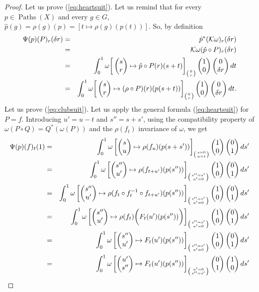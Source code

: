 \documentclass[10pt,reqno,twoside]{amsart}
\newcommand{\mymatrix}[1]{\begin{pmatrix} #1 \end{pmatrix}}
\newcommand{\cK}{\mathcal{K}}
\DeclareMathOperator{\Paths}{Paths}
\theoremstyle{plain}
\theoremstyle{definition}
\begin{document}
  \begin{proof}
    Let us prove (\ref{eq:heartsuit}).
    Let us remind that for every $p \in \Paths(X)$ and every $g \in G$,
    $\hat p (g) = \rho(g)(p) = [t \mapsto \rho(g)(p(t))]$.
    So,
    by definition
    \begin{eqnarray*}
      \Psi(p)(P)_r(\delta r) &=& \hat p^*(\cK\omega)_r(\delta r) \\
      &=& \cK\omega(\hat p \circ P)_r(\delta r) \\
      &=& \int_0^1 \omega \bigg[\mymatrix{s \cr r} \mapsto \hat p \circ P (r)(s+t) \bigg]_{\left({0 \atop r}\right)} \mymatrix{1 \cr 0} \mymatrix{0 \cr \delta r} dt \\
      &=& \int_0^1 \omega \bigg[\mymatrix{s \cr r} \mapsto (\rho \circ P)(r)(p(s+t)) \bigg]_{\left({0 \atop r}\right)} \mymatrix{1 \cr 0} \mymatrix{0 \cr \delta r} dt.
    \end{eqnarray*}
    Let us prove (\ref{eq:clubsuit}).
    Let us apply the general formula (\ref{eq:heartsuit}) for $P = f$.
    Introducing $u' = u-t$ and $s'' = s+s'$,
    using the compatibility property of $\omega(P \circ Q) = Q^*(\omega(P))$ and the $\rho(f_t)$ invariance of $\omega$,
    we get
    \begin{eqnarray*}
      \Psi(p)(f)_t(1) &=& \int_0^1 \omega \left[ \mymatrix{s \cr u} \mapsto \rho(f_u)(p(s + s')) \right]_{\left({s=0 \atop u=t}\right)}\mymatrix{1 \cr 0} \mymatrix{0 \cr 1} ds' \\
      &=& \int_0^1 \omega \left[ \mymatrix{s'' \cr u'} \mapsto \rho(f_{t+u'})(p(s'')) \right]_{\left({s''=s' \atop u'=0}\right)}\mymatrix{1 \cr 0} \mymatrix{0 \cr 1} ds' \\
      &=& \int_0^1 \omega \left[ \mymatrix{s'' \cr u'} \mapsto \rho(f_t \circ f_t^{-1} \circ f_{t+ u'})(p(s'')) \right]_{\left({s''= s' \atop u'=0}\right)}\mymatrix{1 \cr 0} \mymatrix{0 \cr 1} ds' \\
      &=& \int_0^1 \omega \left[ \mymatrix{s'' \cr u'} \mapsto \rho(f_t) \bigg(F_t(u')(p(s''))\bigg) \right]_{\left({s''=s' \atop u'=0}\right)}\mymatrix{1 \cr 0} \mymatrix{0 \cr 1} ds' \\
      &=& \int_0^1 \omega \left[ \mymatrix{s'' \cr u'} \mapsto F_t(u')(p(s'')) \right]_{\left({s''=s' \atop u'=0}\right)}\mymatrix{1 \cr 0} \mymatrix{0 \cr 1} ds' \\
      &=& \int_0^1 \omega \left[ \mymatrix{u' \cr s''} \mapsto F_t(u')(p(s'')) \right]_{\left({u'=0 \atop s''=s'}\right)}\mymatrix{0 \cr 1} \mymatrix{1 \cr 0} ds' \\

\end{eqnarray*}
\end{proof}
\end{document}
